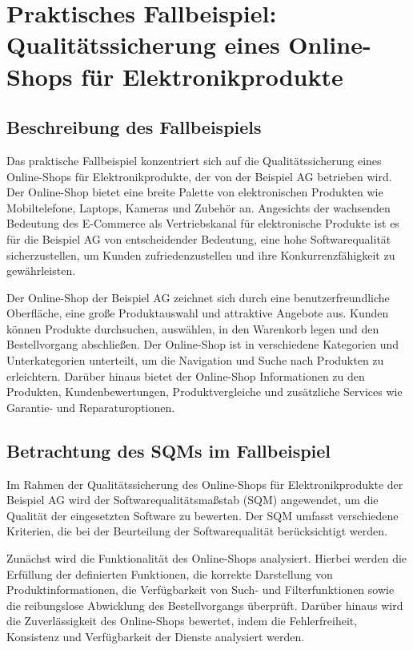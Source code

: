 \section{Praktisches Fallbeispiel: Qualitätssicherung eines Online-Shops für Elektronikprodukte}

\subsection{Beschreibung des Fallbeispiels}
Das praktische Fallbeispiel konzentriert sich auf die Qualitätssicherung eines Online-Shops für Elektronikprodukte, der von der Beispiel AG betrieben wird. Der Online-Shop bietet eine breite Palette von elektronischen Produkten wie Mobiltelefone, Laptops, Kameras und Zubehör an. Angesichts der wachsenden Bedeutung des E-Commerce als Vertriebskanal für elektronische Produkte ist es für die Beispiel AG von entscheidender Bedeutung, eine hohe Softwarequalität sicherzustellen, um Kunden zufriedenzustellen und ihre Konkurrenzfähigkeit zu gewährleisten.

Der Online-Shop der Beispiel AG zeichnet sich durch eine benutzerfreundliche Oberfläche, eine große Produktauswahl und attraktive Angebote aus. Kunden können Produkte durchsuchen, auswählen, in den Warenkorb legen und den Bestellvorgang abschließen. Der Online-Shop ist in verschiedene Kategorien und Unterkategorien unterteilt, um die Navigation und Suche nach Produkten zu erleichtern. Darüber hinaus bietet der Online-Shop Informationen zu den Produkten, Kundenbewertungen, Produktvergleiche und zusätzliche Services wie Garantie- und Reparaturoptionen.

\subsection{Betrachtung des SQMs im Fallbeispiel}
Im Rahmen der Qualitätssicherung des Online-Shops für Elektronikprodukte der Beispiel AG wird der Softwarequalitätsmaßstab (SQM) angewendet, um die Qualität der eingesetzten Software zu bewerten. Der SQM umfasst verschiedene Kriterien, die bei der Beurteilung der Softwarequalität berücksichtigt werden.

Zunächst wird die Funktionalität des Online-Shops analysiert. Hierbei werden die Erfüllung der definierten Funktionen, die korrekte Darstellung von Produktinformationen, die Verfügbarkeit von Such- und Filterfunktionen sowie die reibungslose Abwicklung des Bestellvorgangs überprüft. Darüber hinaus wird die Zuverlässigkeit des Online-Shops bewertet, indem die Fehlerfreiheit, Konsistenz und Verfügbarkeit der Dienste analysiert werden.

